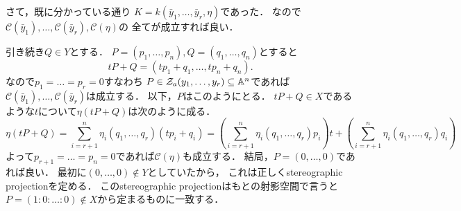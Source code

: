 \documentclass[a4paper]{jsarticle}
\newcommand{\cond}{\mathcal{C}}
\begin{document}
    さて，既に分かっている通り
    $K=k(\bar{y}_1,\dots,\bar{y}_r, \eta)$であった．
    なので$\cond(\bar{y}_1),\dots,\cond(\bar{y}_r), \cond(\eta)$の
    全てが成立すれば良い．

    引き続き$Q \in Y$とする．
    $P=(p_1, \dots, p_n), Q=(q_1, \dots, q_n)$とすると
    \[ tP+Q=(tp_1+q_1, \dots, tp_n+q_n). \]
    なので$p_1=\dots=p_r=0$すなわち
    $P \in \mathcal{Z}_a(y_1,\dots,y_r) \subseteq \mathbb{A}^n$であれば
    $\cond(\bar{y}_1),\dots,\cond(\bar{y}_r)$は成立する．
    以下，$P$はこのようにとる．
    $tP+Q \in X$であるような$t$について$\eta(tP+Q)$は次のように成る．
    \[
        \eta(tP+Q)
        =\sum_{i=r+1}^{n} \eta_i(q_1,\dots,q_r) (tp_i+q_i)
        =\left( \sum_{i=r+1}^{n} \eta_i(q_1,\dots,q_r)p_i \right)t+\left( \sum_{i=r+1}^{n} \eta_i(q_1,\dots,q_r)q_i \right)
    \]
    よって$p_{r+1}=\dots=p_{n}=0$であれば$\cond(\eta)$も成立する．
    結局，$P=(0,\dots,0)$であれば良い．
    最初に$(0,\dots,0) \not \in Y$としていたから，
    これは正しくstereographic projectionを定める．
    このstereographic projectionはもとの射影空間で言うと
    $P=(1:0:\dots:0) \not \in X$から定まるものに一致する．
\end{document}
